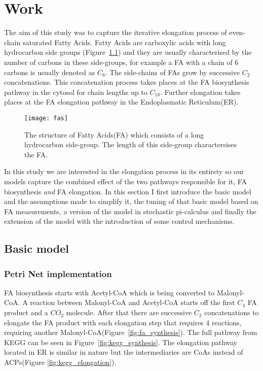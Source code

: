 

\chapter{Work}
\label{chap:work}
\ifpdf
    \graphicspath{{Chapter3/Figs/Raster/}{Chapter3/Figs/PDF/}{Chapter3/Figs/}}
\else
    \graphicspath{{Chapter3/Figs/Vector/}{Chapter3/Figs/}}
\fi

The aim of this study was to capture the iterative elongation process
of even-chain saturated Fatty Acids. Fatty Acids are
carboxylic acids with long hydrocarbon side groups
(Figure~\ref{fig:fas}) and they are usually characterised by the
number of carbons in these side-groups, for example a FA with a chain
of 6 carbons is usually denoted as $C_6$. The side-chains of FAs grow
by successive $C_2$ concatenations. This concatenation process takes places at
the FA biosynthesis pathway in the cytosol for chain lengths up to
$C_{18}$. Further elongation takes places at the FA elongation
pathway in the Endoplasmatic Reticulum(ER).

\begin{figure}[htbp!]
\centering
\texttt{[image: fas]}
\caption[Fatty Acid structure]{The structure of Fatty Acids(FA) which
  consists of a long hydrocarbon side-group. The length of this
  side-group charactersises the FA.}
\label{fig:fas}
\end{figure}

In this study we are interested in the elongation process in its
entirety so our models capture the combined effect of the two pathways
responsible for it, FA biosynthesis \textit{and} FA elongation. In
this section I first introduce the basic model and the assumptions
made to simplify it, the tuning of that basic model based on FA
measurements, a version of the model in stochastic pi-calculus and
finally the extension of the model with the introduction of some
control mechanisms.

\section{Basic model}
\subsection{Petri Net implementation}
FA biosynthesis starts with Acetyl-CoA which is being converted to
Malonyl-CoA. A reaction between Malonyl-CoA and Acetyl-CoA starts off
the first $C_4$ FA product and a $CO_2$ molecule. After that there are successive $C_2$
concatenations to elongate the FA product with each elongation step
that requires 4 reactions, requiring another Malonyl-CoA(Figure~\ref{fig:fa_synthesis}). The
full pathway from KEGG can be seen in
Figure~\ref{fig:kegg_synthesis}. The elongation pathway located in ER
is similar in nature but the intermediaries are CoAs instead of
ACPs(Figure \ref{fig:kegg_elongation}).

